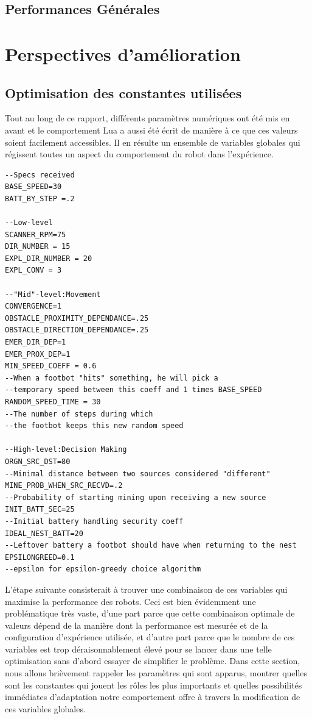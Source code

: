 \FloatBarrier

\subsection{Performances Générales}



\section{Perspectives d'amélioration}

\subsection{Optimisation des constantes utilisées}
Tout au long de ce rapport, différents paramètres numériques ont été mis en avant et le comportement Lua a aussi été écrit de manière à ce que ces valeurs soient facilement accessibles. Il en résulte un ensemble de variables globales qui régissent toutes un aspect du comportement du robot dans l'expérience.

\begin{lstlisting}[caption=Définitions des variables globales]
--Specs received
BASE_SPEED=30
BATT_BY_STEP =.2

--Low-level
SCANNER_RPM=75
DIR_NUMBER = 15
EXPL_DIR_NUMBER = 20
EXPL_CONV = 3

--"Mid"-level:Movement
CONVERGENCE=1
OBSTACLE_PROXIMITY_DEPENDANCE=.25
OBSTACLE_DIRECTION_DEPENDANCE=.25
EMER_DIR_DEP=1
EMER_PROX_DEP=1
MIN_SPEED_COEFF = 0.6
--When a footbot "hits" something, he will pick a
--temporary speed between this coeff and 1 times BASE_SPEED
RANDOM_SPEED_TIME = 30
--The number of steps during which
--the footbot keeps this new random speed

--High-level:Decision Making
ORGN_SRC_DST=80
--Minimal distance between two sources considered "different"
MINE_PROB_WHEN_SRC_RECVD=.2
--Probability of starting mining upon receiving a new source
INIT_BATT_SEC=25
--Initial battery handling security coeff
IDEAL_NEST_BATT=20
--Leftover battery a footbot should have when returning to the nest
EPSILONGREED=0.1
--epsilon for epsilon-greedy choice algorithm
\end{lstlisting}

L'étape suivante consisterait à trouver une combinaison de ces variables qui maximise la performance des robots. Ceci est bien évidemment une problématique très vaste, d'une part parce que cette combinaison optimale de valeurs dépend de la manière dont la performance est mesurée et de la configuration d'expérience utilisée, et d'autre part parce que le nombre de ces variables est trop déraisonnablement élevé pour se lancer dans une telle optimisation sans d'abord essayer de simplifier le problème. Dans cette section, nous allons brièvement rappeler les paramètres qui sont apparus, montrer quelles sont les constantes qui jouent les rôles les plus importants et quelles possibilités immédiates d'adaptation notre comportement offre à travers la modification de ces variables globales.

